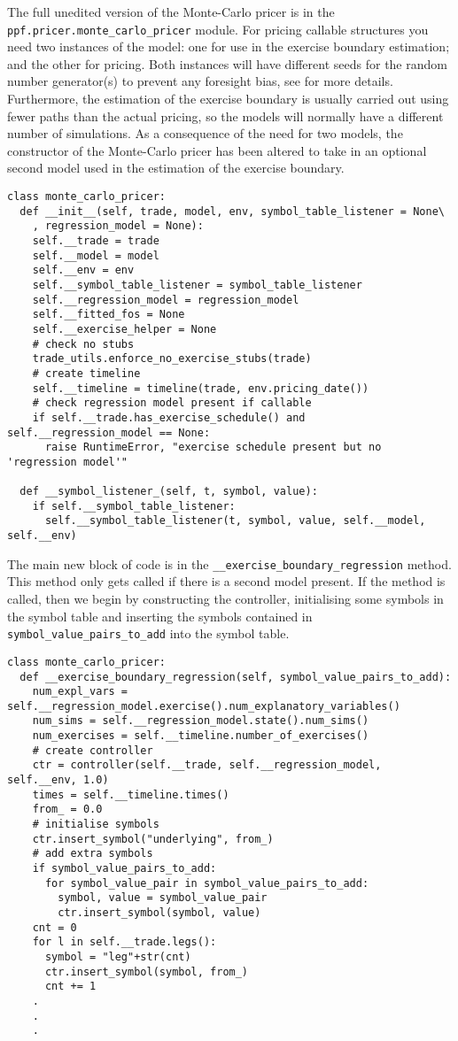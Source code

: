 The full unedited version of the Monte-Carlo pricer is in the \\
\verb|ppf.pricer.monte_carlo_pricer| module. For
pricing callable structures you need two instances of the model: one
for use in the exercise boundary estimation; and the other for
pricing. Both instances will have different seeds for the random
number generator(s) to prevent any foresight bias, see
\cite{article:FRIES05} for more details. Furthermore, the estimation
of the exercise boundary is usually carried out using fewer paths than
the actual pricing, so the models will normally have a different number
of simulations. As a consequence of the need for two models, the
constructor of the Monte-Carlo pricer has been altered to take in an
optional second model used in the estimation of the exercise
boundary. 
\begin{verbatim}
class monte_carlo_pricer:
  def __init__(self, trade, model, env, symbol_table_listener = None\
    , regression_model = None):
    self.__trade = trade
    self.__model = model
    self.__env = env
    self.__symbol_table_listener = symbol_table_listener
    self.__regression_model = regression_model
    self.__fitted_fos = None
    self.__exercise_helper = None
    # check no stubs
    trade_utils.enforce_no_exercise_stubs(trade)
    # create timeline
    self.__timeline = timeline(trade, env.pricing_date())   
    # check regression model present if callable
    if self.__trade.has_exercise_schedule() and self.__regression_model == None:
      raise RuntimeError, "exercise schedule present but no 'regression model'"

  def __symbol_listener_(self, t, symbol, value):
    if self.__symbol_table_listener:
      self.__symbol_table_listener(t, symbol, value, self.__model, self.__env)
\end{verbatim}
The main new block of code is in the
\verb|__exercise_boundary_regression| method. This method only gets
called if there is a second model present. If the method is called, then 
we begin by constructing the controller, initialising some symbols in the 
symbol table and inserting the symbols contained in \verb|symbol_value_pairs_to_add| 
into the symbol table.
\begin{verbatim}
class monte_carlo_pricer:
  def __exercise_boundary_regression(self, symbol_value_pairs_to_add):
    num_expl_vars = self.__regression_model.exercise().num_explanatory_variables()
    num_sims = self.__regression_model.state().num_sims()
    num_exercises = self.__timeline.number_of_exercises()
    # create controller
    ctr = controller(self.__trade, self.__regression_model, self.__env, 1.0)
    times = self.__timeline.times()
    from_ = 0.0
    # initialise symbols
    ctr.insert_symbol("underlying", from_)
    # add extra symbols
    if symbol_value_pairs_to_add:
      for symbol_value_pair in symbol_value_pairs_to_add:
        symbol, value = symbol_value_pair
        ctr.insert_symbol(symbol, value)
    cnt = 0
    for l in self.__trade.legs():
      symbol = "leg"+str(cnt)
      ctr.insert_symbol(symbol, from_)      
      cnt += 1
    .
    .
    .
\end{verbatim}
